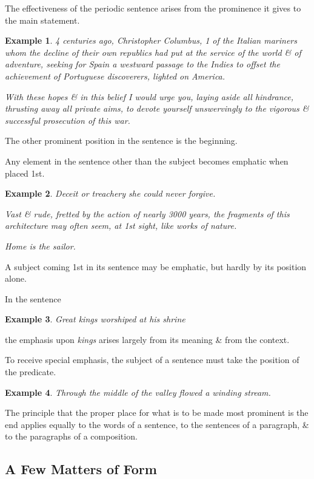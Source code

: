 \documentclass{article}
\newtheorem{example}{Example}
\begin{document}
The effectiveness of the periodic sentence arises from the prominence it gives to the main statement.
\begin{example}
	4 centuries ago, Christopher Columbus, 1 of the Italian mariners whom the decline of their own republics had put at the service of the world \& of adventure, seeking for Spain a westward passage to the Indies to offset the achievement of Portuguese discoverers, lighted on America.
	
	With these hopes \& in this belief I would urge you, laying aside all hindrance, thrusting away all private aims, to devote yourself unswervingly to the vigorous \& successful prosecution of this war.
\end{example}
The other prominent position in the sentence is the beginning.

Any element in the sentence other than the subject becomes emphatic when placed 1st.
\begin{example}
	Deceit or treachery she could never forgive.
	
	Vast \& rude, fretted by the action of nearly 3000 years, the fragments of this architecture may often seem, at 1st sight, like works of nature.
	
	Home is the sailor.
\end{example}
A subject coming 1st in its sentence may be emphatic, but hardly by its position alone.

In the sentence
\begin{example}
	Great kings worshiped at his shrine
\end{example}
the emphasis upon {\it kings} arises largely from its meaning \& from the context.

To receive special emphasis, the subject of a sentence must take the position of the predicate.
\begin{example}
	Through the middle of the valley flowed a winding stream.
\end{example}
The principle that the proper place for what is to be made most prominent is the end applies equally to the words of a sentence, to the sentences of a paragraph, \& to the paragraphs of a composition.


\subsection{A Few Matters of Form}
\end{document}
